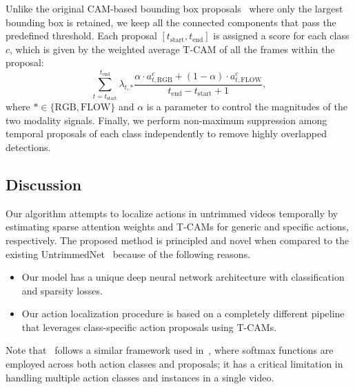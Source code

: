 \documentclass[10pt,twocolumn,letterpaper]{article}
\begin{document}
Unlike the original CAM-based bounding box proposals~\cite{zhou16learning} where only the largest bounding box is retained, we keep all the connected components that pass the predefined threshold. 
Each proposal $[t_{\text{start}},t_{\text{end}}]$ is assigned a score for each class $c$, which is given by the weighted average T-CAM of all the frames within the proposal:
\begin{equation}
\sum_{t=t_{\text{start}}}^{t_{\text{end}}}\lambda_{t, *} \frac{\alpha \cdot a^c_{t,\text{RGB}}+ (1-\alpha) \cdot a^c_{t,\text{FLOW}}}{t_{\text{end}}-t_{\text{start}}+1}\label{eq:box_score},
\end{equation}where $* \in \{ \text{RGB}, \text{FLOW} \}$ and $\alpha$ is a parameter to control the magnitudes of the two modality signals.
Finally, we perform non-maximum suppression among temporal proposals of each class independently to remove highly overlapped detections.
































\subsection{Discussion}
\label{sub:discussion}

Our algorithm attempts to localize actions in untrimmed videos temporally by estimating sparse attention weights and T-CAMs for generic and specific actions, respectively.
The proposed method is principled and novel when compared to the existing UntrimmedNet~\cite{wang17untrimmednets} because of the following reasons.
\begin{itemize}
\item Our model has a unique deep neural network architecture with classification and sparsity losses.
\item Our action localization procedure is based on a completely different pipeline that leverages class-specific action proposals using T-CAMs.
\end{itemize}
Note that~\cite{wang17untrimmednets} follows a similar framework used in~\cite{bilen16weakly}, where softmax functions are employed across both action classes and proposals; it has a critical limitation in handling multiple action classes and instances in a single video.
\end{document}
